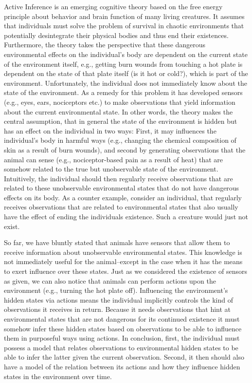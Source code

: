 Active Inference is an emerging cognitive theory based on the free energy principle about behavior and brain function of many living creatures. It assumes that individuals must solve the problem of survival in chaotic environments that potentially desintegrate their physical bodies and thus end their existences. Furthermore, the theory takes the perspective that these dangerous environmental effects on the individual's body are dependent on the current state of the environment itself, e.g., getting burn wounds from touching a hot plate is dependent on the state of that plate itself (is it hot or cold?), which is part of the environment. Unfortunately, the individual does not immediately know about the state of the environment. As a remedy for this problem it has developed sensors (e.g., eyes, ears, nociceptors etc.) to make observations that yield information about the current environmental state. In other words, the theory makes the central assumption, that in general the state of the environment is hidden but has an effect on the individual in two ways: First, it may influences the individual's body in harmful ways (e.g., changing the chemical composition of skin as a result of burn wounds), and second by generating observations that the animal can sense (e.g., nociceptor-based pain as a result of heat) that are somehow related to the true but unobservable state of the environment. Intuitively, the individual should then regularly receive observations that are related to these unobservable environmental states that do not have dangerous effects on its body. As a counter example, consider an individual, that regularly receives observations that are related to environmental states that also usually have the effect of ending the individuals existence. Such a creature would just not exist.

So far, we have bluntly stated that animals have sensors that allow them to receive information about unobservable environmental states. This knowledge is not immediately useful for the animal--except in the case when it has the means to exert influence over these states. Just as we considered the existence of sensors as given, we can also notice that animals can perform actions upon the environment (e.g., turning the hot plate off). Influencing the environment's hidden states via actions means the individual implicitly controls the kind of observations it receives in return. Because it needs observations that hint at environmental states that are not dangerous for its continued existence it must somehow infer these hidden states based on observations to be able to influence them in purposeful ways using actions. In conclusion, first, the individual must possess a model that relates observations to environmental hidden states to be able to infer the latter given the current observation. Second, it then should also have a model of the relation between its actions and how they influence hidden states in the environment over time.

